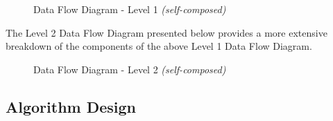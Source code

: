 \begin{figure}[h!]
\centering
\setlength{\fboxsep}{10pt}%
\setlength{\fboxrule}{0.5pt}%
\caption{Data Flow Diagram - Level 1 \textit{(self-composed)}}
\label{fig:data-flow-diagram-l1}
\end{figure}


\noindent The Level 2 Data Flow Diagram presented below provides a more extensive breakdown of the components of the above Level 1 Data Flow Diagram.


\begin{figure}[h!]
\centering
\setlength{\fboxsep}{10pt}%
\setlength{\fboxrule}{0.5pt}%
\caption{Data Flow Diagram - Level 2 \textit{(self-composed)}}
\label{fig:data-flow-diagram-l2}
\end{figure}

\subsection{Algorithm Design}

